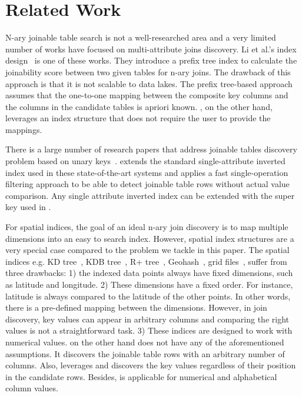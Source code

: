 \section{Related Work}\label{sec:related}
N-ary joinable table search is not a well-researched area and a very limited number of works have focused on multi-attribute joins discovery. Li et al.'s index design~\cite{li2015efficient} is one of these works. They introduce a prefix tree index to calculate the joinability score between two given tables for n-ary joins. 
The drawback of this approach is that it is not scalable to data lakes. The prefix tree-based approach assumes that the one-to-one mapping between the composite key columns and the columns in the candidate tables is apriori known. 
\system, on the other hand, leverages an index structure that does not require the user to provide the mappings. 

There is a large number of research papers that address joinable tables discovery problem based on unary keys~\cite{zhu2019josie, xiao2009top, eberius2015top, das2012finding, yakout2012infogather, zhang2013infogather+, fernandez2018aurum, DBLP:journals/pvldb/ZhuNPM16, DBLP:conf/sigmod/ZhangI20}. 
\system extends the standard single-attribute inverted index used in these state-of-the-art systems and applies a fast single-operation filtering approach to be able to detect joinable table rows without actual value comparison. Any single attribute inverted index can be extended with the super key used in \system.

For spatial indices, the goal of an ideal n-ary join discovery is to map multiple dimensions into an easy to search index. However, spatial index structures are a very special case compared to the problem we tackle in this paper. The spatial indices e.g. KD tree~\cite{bentley1975multidimensional}, KDB tree~\cite{robinson1981kdb}, R+ tree~\cite{sellis1987r+}, Geohash~\cite{geohash}, grid files~\cite{nievergelt1984grid}, suffer from three drawbacks: 1) the indexed data points always have fixed dimensions, such as latitude and longitude. 2) These dimensions have a fixed order. For instance, latitude is always compared to the latitude of the other points. In other words, there is a pre-defined mapping between the dimensions. However, in join discovery, key values can appear in arbitrary columns and comparing the right values is not a straightforward task. 3) These indices are designed to work with numerical values. 
\system on the other hand does not have any of the aforementioned assumptions. It discovers the joinable table rows with an arbitrary number of columns. Also, \system leverages \hash and discovers the key values regardless of their position in the candidate rows. Besides, \hash is applicable for numerical and alphabetical column values.

